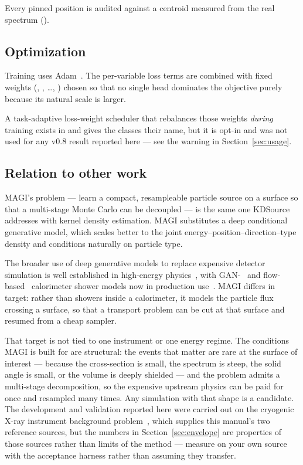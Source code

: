 \documentclass[11pt,a4paper]{article}
\begin{document}
Every pinned position is audited against
a centroid measured from the real spectrum
().

\subsection{Optimization}

Training uses Adam~\cite{Kingma2015Adam}. The per-variable loss terms are
combined with fixed weights (, , \ldots,
) chosen so that no single head dominates the objective
purely because its natural scale is larger.

A task-adaptive loss-weight scheduler that rebalances those weights
\emph{during} training exists in
 and gives the
 classes their name, but it is opt-in and was not used
for any v0.8 result reported here --- see the warning in
Section~\ref{sec:usage}.

\subsection{Relation to other work}

MAGI's problem --- learn a compact, resampleable particle source on a surface so
that a multi-stage Monte Carlo can be decoupled --- is the same one
KDSource~\cite{Schmidt2022KDSource} addresses with kernel density estimation.
MAGI substitutes a deep conditional generative model, which scales better to
the joint energy--position--direction--type density and conditions naturally on
particle type.

The broader use of deep generative models to replace expensive detector
simulation is well established in high-energy
physics~\cite{Hashemi2024Review}, with GAN-~\cite{Paganini2018CaloGAN} and
flow-based~\cite{Krause2021CaloFlow} calorimeter shower models now in
production use~\cite{ATLAS2024PhotonShower}. MAGI differs in target: rather
than showers inside a calorimeter, it models the particle flux crossing a
surface, so that a transport problem can be cut at that surface and resumed
from a cheap sampler.

That target is not tied to one instrument or one energy regime. The conditions
MAGI is built for are structural: the events that matter are rare at the
surface of interest --- because the cross-section is small, the spectrum is
steep, the solid angle is small, or the volume is deeply shielded --- and the
problem admits a multi-stage decomposition, so the expensive upstream physics
can be paid for once and resampled many times. Any simulation with that shape
is a candidate. The development and validation reported here were carried out
on the cryogenic X-ray instrument background
problem~\cite{Lotti2021XIFUBackground}, which supplies this manual's two
reference sources, but the numbers in Section~\ref{sec:envelope} are properties
of those sources rather than limits of the method --- measure on your own
source with the acceptance harness rather than assuming they transfer.
\end{document}
